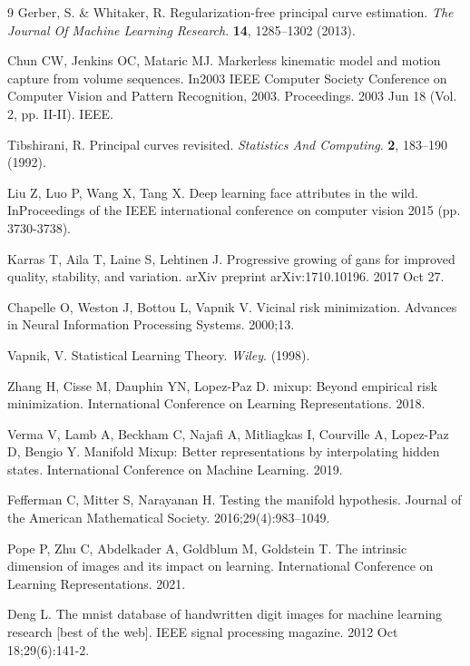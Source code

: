 \documentclass[preprint,12pt,number]{elsarticle}
\begin{document}
\begin{thebibliography}{9}
Gerber, S. \& Whitaker, R. Regularization-free principal curve estimation. 
{\em The Journal Of Machine Learning Research}.
 \textbf{14}, 1285--1302 (2013).
 
Chun CW, Jenkins OC, Mataric MJ. Markerless kinematic model and motion capture from volume sequences. In2003 IEEE Computer Society Conference on Computer Vision and Pattern Recognition, 2003. Proceedings. 2003 Jun 18 (Vol. 2, pp. II-II). IEEE.

Tibshirani, R. Principal curves revisited. 
{\em Statistics And Computing}.
 \textbf{2}, 183--190 (1992).
 
Liu Z, Luo P, Wang X, Tang X. Deep learning face attributes in the wild. InProceedings of the IEEE international conference on computer vision 2015 (pp. 3730-3738).

Karras T, Aila T, Laine S, Lehtinen J. Progressive growing of gans for improved quality, stability, and variation. arXiv preprint arXiv:1710.10196. 2017 Oct 27.

Chapelle O, Weston J, Bottou L, Vapnik V. Vicinal risk minimization. Advances in Neural Information Processing Systems. 2000;13.

Vapnik, V. Statistical Learning Theory.
{\em Wiley}. (1998).

Zhang H, Cisse M, Dauphin YN, Lopez-Paz D. mixup: Beyond empirical risk minimization. International Conference on Learning Representations. 2018.

Verma V, Lamb A, Beckham C, Najafi A, Mitliagkas I, Courville A, Lopez-Paz D, Bengio Y. Manifold Mixup: Better representations by interpolating hidden states. International Conference on Machine Learning. 2019.

Fefferman C, Mitter S, Narayanan H. Testing the manifold hypothesis. Journal of the American Mathematical Society. 2016;29(4):983--1049.

Pope P, Zhu C, Abdelkader A, Goldblum M, Goldstein T. The intrinsic dimension of images and its impact on learning. International Conference on Learning Representations. 2021.

Deng L. The mnist database of handwritten digit images for machine learning research [best of the web]. IEEE signal processing magazine. 2012 Oct 18;29(6):141-2.


\end{thebibliography}
\end{document}
